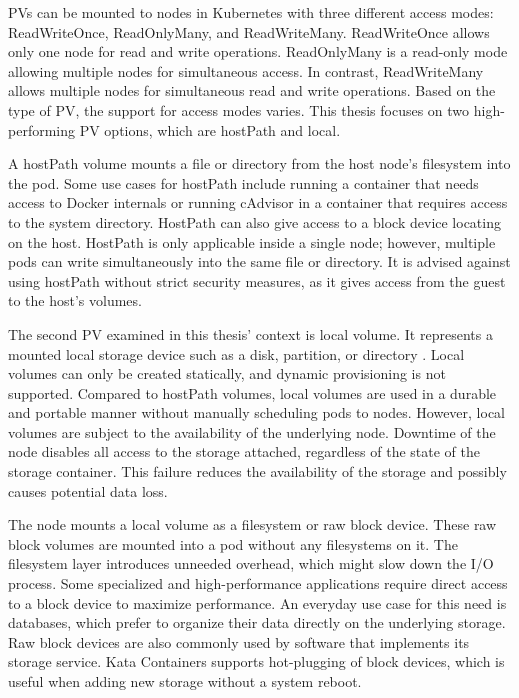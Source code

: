 PVs can be mounted to nodes in Kubernetes with three different access modes: ReadWriteOnce, ReadOnlyMany, and ReadWriteMany. ReadWriteOnce allows only one node for read and write operations. ReadOnlyMany is a read-only mode allowing multiple nodes for simultaneous access. In contrast, ReadWriteMany allows multiple nodes for simultaneous read and write operations. Based on the type of PV, the support for access modes varies. This thesis focuses on two high-performing PV options, which are hostPath and local. \cite{PV} 

A hostPath volume mounts a file or directory from the host node's filesystem into the pod. Some use cases for hostPath include running a container that needs access to Docker internals or running cAdvisor in a container that requires access to the system directory. HostPath can also give access to a block device locating on the host. HostPath is only applicable inside a single node; however, multiple pods can write simultaneously into the same file or directory. It is advised against using hostPath without strict security measures, as it gives access from the guest to the host's volumes. \cite{VolumesKubernetes}

The second PV examined in this thesis' context is local volume. It represents a mounted local storage device such as a disk, partition, or directory \cite{VolumesKubernetes}. Local volumes can only be created statically, and dynamic provisioning is not supported. Compared to hostPath volumes, local volumes are used in a durable and portable manner without manually scheduling pods to nodes. However, local volumes are subject to the availability of the underlying node. Downtime of the node disables all access to the storage attached, regardless of the state of the storage container. This failure reduces the availability of the storage and possibly causes potential data loss.

The node mounts a local volume as a filesystem or raw block device. These raw block volumes are mounted into a pod without any filesystems on it. The filesystem layer introduces unneeded overhead, which might slow down the I/O process. Some specialized and high-performance applications require direct access to a block device to maximize performance. An everyday use case for this need is databases, which prefer to organize their data directly on the underlying storage. Raw block devices are also commonly used by software that implements its storage service. Kata Containers supports hot-plugging of block devices, which is useful when adding new storage without a system reboot. \cite{RawBlockKubernetes}

